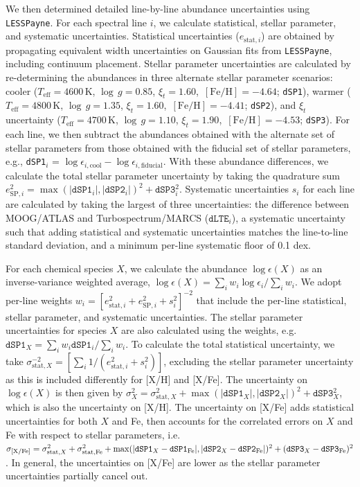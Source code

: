 \documentclass{natureprintstyle}
\newcommand{\code}[1]{\texttt{#1}\xspace}
\newcommand{\unit}[1]{\ensuremath{\mathrm{\,#1}}\xspace}
\newcommand{\feh}{\unit{[Fe/H]}}
\newcommand{\teff}{\ensuremath{T_\mathrm{eff}}\xspace}
\newcommand{\Teff}{\teff}
\newcommand{\logg}{\ensuremath{\log\,g}\xspace}
\begin{document}
We then determined detailed line-by-line abundance uncertainties using \code{LESSPayne}.
For each spectral line $i$, we calculate statistical, stellar parameter, and systematic uncertainties.
Statistical uncertainties ($e_{\text{stat}, i}$) are obtained by propagating equivalent width uncertainties on Gaussian fits from \code{LESSPayne}, including continuum placement\cite{Ji2020b}.
Stellar parameter uncertainties are calculated by re-determining the abundances in three alternate stellar parameter scenarios: 
cooler ($\Teff=4600$\,K, $\logg=0.85$, $\xi_t=1.60$, $\feh=-4.64$; \code{dSP1}), 
warmer ($\Teff=4800$\,K, $\logg=1.35$, $\xi_t=1.60$, $\feh=-4.41$; \code{dSP2}), and 
$\xi_t$ uncertainty ($\Teff=4700$\,K, $\logg=1.10$, $\xi_t=1.90$, $\feh=-4.53$; \code{dSP3}).
For each line, we then subtract the abundances obtained with the alternate set of stellar parameters from those obtained with the fiducial set of stellar parameters, 
e.g., \code{dSP1}{$_i$} = $\log \epsilon_{i, \text{cool}} - \log \epsilon_{i, \text{fiducial}}$. 
With these abundance differences, we calculate the total stellar parameter uncertainty by taking the quadrature sum $e_{\text{SP},i}^2 = \max(|\code{dSP1}_i|, |\code{dSP2}_i|)^2 + \code{dSP3}_i^2$.
Systematic uncertainties $s_i$ for each line are calculated by taking the largest of three uncertainties: the difference between MOOG/ATLAS and Turbospectrum/MARCS ($\code{dLTE}_i$), a systematic uncertainty such that adding statistical and systematic uncertainties matches the line-to-line standard deviation\cite{Ji2020b}, and a minimum per-line systematic floor of 0.1 dex.

For each chemical species $X$, we calculate the abundance $\log \epsilon(X)$ as an inverse-variance weighted average, $\log\epsilon(X) = \sum_i w_i \log\epsilon_i/\sum_i w_i$.
We adopt per-line weights $w_i = \left[e_{\text{stat},i}^2 + e_{\text{SP},i}^2 + s_i^2\right]^{-2}$ that include the per-line statistical, stellar parameter, and systematic uncertainties.
The stellar parameter uncertainties for species $X$ are also calculated using the weights, e.g. $\code{dSP1}_X = \sum_i w_i \code{dSP1}_i/\sum_i w_i$.
To calculate the total statistical uncertainty, we take $\sigma_{\text{stat},X}^{-2} = \left[\sum_i 1/(e_{\text{stat},i}^2 + s_i^2) \right]$, excluding the stellar parameter uncertainty as this is included differently for [X/H] and [X/Fe].
The uncertainty on $\log\epsilon(X)$ is then given by $\sigma_{X}^2 = \sigma_{\text{stat},X}^2 + \max(|\code{dSP1}_X|, |\code{dSP2}_X|)^2 + \code{dSP3}_X^2$, which is also the uncertainty on [X/H].
The uncertainty on [X/Fe] adds statistical uncertainties for both $X$ and Fe, then accounts for the correlated errors on $X$ and Fe with respect to stellar parameters, i.e. $\sigma_{\text{[X/Fe]}} = \sigma_{\text{stat},X}^2 + \sigma_{\text{stat},\text{Fe}}^2 + \max(|\code{dSP1}_X - \code{dSP1}_{\rm Fe}|, |\code{dSP2}_X - \code{dSP2}_{\rm Fe}|)^2 + (\code{dSP3}_X - \code{dSP3}_{\rm Fe})^2$.
In general, the uncertainties on [X/Fe] are lower as the stellar parameter uncertainties partially cancel out.
\end{document}
